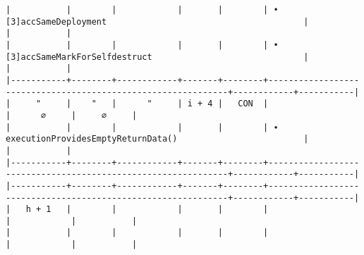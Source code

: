 \documentclass[varwidth=\maxdimen,margin=0.5cm,multi={verbatim}]{standalone}
\begin{document}
\begin{verbatim}
|           |        |            |       |        | • [3]accSameDeployment                                       |            |           |
|           |        |            |       |        | • [3]accSameMarkForSelfdestruct                              |            |           |
|-----------+--------+------------+-------+--------+--------------------------------------------------------------+------------+-----------|
|     "     |    "   |      "     | i + 4 |   CON  |                                                              |      ∅     |     ∅     |
|           |        |            |       |        | ∙ executionProvidesEmptyReturnData()                         |            |           |
|-----------+--------+------------+-------+--------+--------------------------------------------------------------+------------+-----------|
|-----------+--------+------------+-------+--------+--------------------------------------------------------------+------------+-----------|
|   h + 1   |        |            |       |        |                                                              |            |           |
|           |        |            |       |        |                                                              |            |           |
\end{verbatim}
\end{document}
